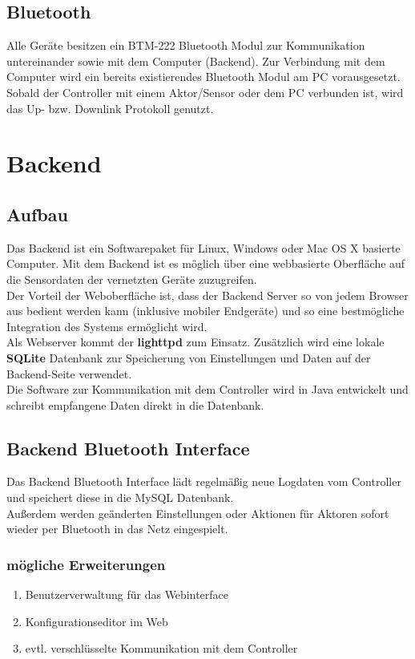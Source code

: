 \documentclass[12pt,a4paper]{article}
\begin{document}
\subsection{Bluetooth}
Alle Geräte besitzen ein BTM-222 Bluetooth Modul zur Kommunikation untereinander sowie mit dem Computer (Backend). Zur Verbindung mit dem Computer wird ein bereits existierendes Bluetooth Modul am PC vorausgesetzt. \\
Sobald der Controller mit einem Aktor/Sensor oder dem PC verbunden ist, wird das Up- bzw. Downlink Protokoll genutzt.

\section{Backend}

\subsection{Aufbau}

Das Backend ist ein Softwarepaket für Linux, Windows oder Mac OS X basierte Computer. Mit dem Backend ist es möglich über eine webbasierte Oberfläche auf die Sensordaten der vernetzten Geräte zuzugreifen. \\
Der Vorteil der Weboberfläche ist, dass der Backend Server so von jedem Browser aus bedient werden kann (inklusive mobiler Endgeräte) und so eine bestmögliche Integration des Systems ermöglicht wird. \\
Als Webserver kommt der {\bf lighttpd} zum Einsatz. Zusätzlich wird eine lokale {\bf SQLite} Datenbank zur Speicherung von Einstellungen und Daten auf der Backend-Seite verwendet.\\
Die Software zur Kommunikation mit dem Controller wird in Java entwickelt und schreibt empfangene Daten direkt in die Datenbank.

\subsection{Backend Bluetooth Interface}
\label{subsec:BTBackend}

Das Backend Bluetooth Interface lädt regelmäßig neue Logdaten vom Controller und speichert diese in die MySQL Datenbank.\\
Außerdem werden geänderten Einstellungen oder Aktionen für Aktoren sofort wieder per Bluetooth in das Netz eingespielt.

\subsubsection{mögliche Erweiterungen}

\begin{enumerate}
	\item Benutzerverwaltung für das Webinterface
	\item Konfigurationseditor im Web
	\item evtl. verschlüsselte Kommunikation mit dem Controller
\end{enumerate}
\end{document}
